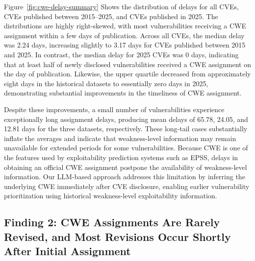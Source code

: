 \documentclass[conference,compsoc]{IEEEtran}
\begin{document}




Figure~\ref{fig:cwe-delay-summary} Shows the distribution of delays for all CVEs, CVEs published between 2015--2025, and CVEs published in 2025. The distributions are highly right-skewed, with most vulnerabilities receiving a CWE assignment within a few days of publication. Across all CVEs, the median delay was 2.24 days, increasing slightly to 3.17 days for CVEs published between 2015 and 2025. In contrast, the median delay for 2025 CVEs was 0 days, indicating that at least half of newly disclosed vulnerabilities received a CWE assignment on the day of publication. Likewise, the upper quartile decreased from approximately eight days in the historical datasets to essentially zero days in 2025, demonstrating substantial improvements in the timeliness of CWE assignment.

Despite these improvements, a small number of vulnerabilities experience exceptionally long assignment delays, producing mean delays of 65.78, 24.05, and 12.81 days for the three datasets, respectively. These long-tail cases substantially inflate the averages and indicate that weakness-level information may remain unavailable for extended periods for some vulnerabilities. Because CWE is one of the features used by exploitability prediction systems such as EPSS, delays in obtaining an official CWE assignment postpone the availability of weakness-level information. Our LLM-based approach addresses this limitation by inferring the underlying CWE immediately after CVE disclosure, enabling earlier vulnerability prioritization using historical weakness-level exploitability information.




\subsection{Finding 2: CWE Assignments Are Rarely Revised, and Most Revisions Occur Shortly After Initial Assignment}
\end{document}
